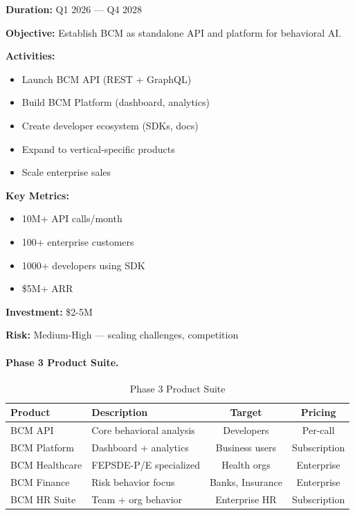 \begin{tcolorbox}[colback=cyan!5!white, colframe=cyan!75!black,
    title=Phase 3: BCM API/Platform]

\textbf{Duration:} Q1 2026 --- Q4 2028

\textbf{Objective:}
Establish BCM as standalone API and platform for behavioral AI.

\textbf{Activities:}
\begin{itemize}[nosep]
\item Launch BCM API (REST + GraphQL)
\item Build BCM Platform (dashboard, analytics)
\item Create developer ecosystem (SDKs, docs)
\item Expand to vertical-specific products
\item Scale enterprise sales
\end{itemize}

\textbf{Key Metrics:}
\begin{itemize}[nosep]
\item 10M+ API calls/month
\item 100+ enterprise customers
\item 1000+ developers using SDK
\item \$5M+ ARR
\end{itemize}

\textbf{Investment:} \$2-5M

\textbf{Risk:} Medium-High --- scaling challenges, competition

\end{tcolorbox}

\paragraph{Phase 3 Product Suite.}

\begin{table}[htbp]
\centering
\caption{Phase 3 Product Suite}
\label{tab:vvv-phase3-products}
\renewcommand{\arraystretch}{1.3}
\begin{tabular}{@{}lp{4cm}cc@{}}
\toprule
\textbf{Product} & \textbf{Description} & \textbf{Target} & \textbf{Pricing} \\
\midrule
BCM API & Core behavioral analysis & Developers & Per-call \\
BCM Platform & Dashboard + analytics & Business users & Subscription \\
BCM Healthcare & FEPSDE-P/E specialized & Health orgs & Enterprise \\
BCM Finance & Risk behavior focus & Banks, Insurance & Enterprise \\
BCM HR Suite & Team + org behavior & Enterprise HR & Subscription \\
\bottomrule
\end{tabular}
\end{table}


